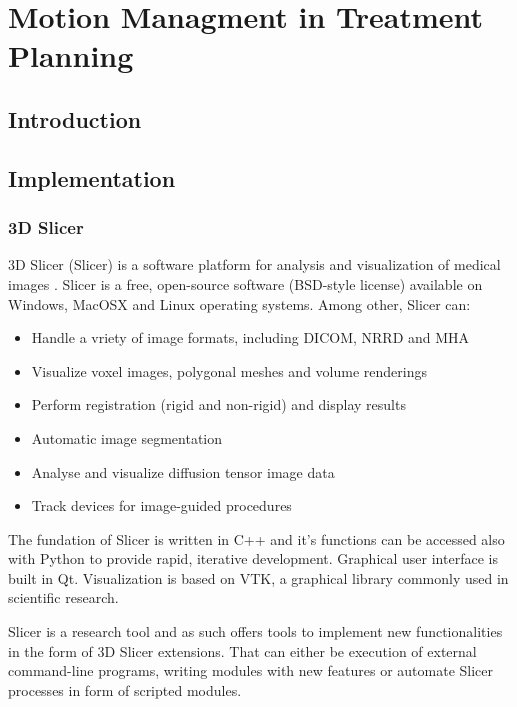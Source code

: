 \documentclass[type=dr, dr=rernat, accentcolor=tud7b,colorbacktitle, bigchapter, openright, twoside, 12pt ]{tudthesis}
\begin{document}
\chapter{Motion Managment in Treatment Planning}
\label{chapter:intro}
\minitoc

\section{Introduction}

\section{Implementation}

\subsection{3D Slicer}

3D Slicer (Slicer) is a software platform for analysis and visualization of medical images \cite{Slicer, Fedorov2012}. Slicer is a free, open-source software (BSD-style license) available on Windows, MacOSX and Linux operating systems. Among other, Slicer can:

\begin{itemize}
	\item Handle a vriety of image formats, including DICOM, NRRD and MHA
	\item Visualize voxel images, polygonal meshes and volume renderings
	\item Perform registration (rigid and non-rigid) and display results
	\item Automatic image segmentation
	\item Analyse and visualize diffusion tensor image data
	\item Track devices for image-guided procedures
\end{itemize}

The fundation of Slicer is written in C++ and it's functions can be accessed also with Python to provide rapid, iterative development. Graphical user interface is built in Qt. Visualization is based on VTK, a graphical library commonly used in scientific research.

Slicer is a research tool and as such offers tools to implement new functionalities in the form of 3D Slicer extensions. That can either be execution of external command-line programs, writing modules with new features or automate Slicer processes in form of scripted modules. 
\end{document}
